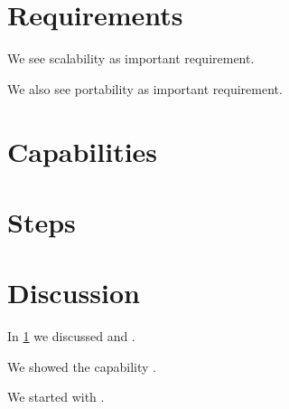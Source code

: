 \documentclass{article}
\begin{document}



\section{Requirements}
\label{secreqs}
We see scalability as important requirement.

We also see portability as important requirement.

\section{Capabilities}

\section{Steps}

\clearpage

\section{Discussion}
In \cref{secreqs} we discussed  and .

We showed the capability .

We started with .
\end{document}
